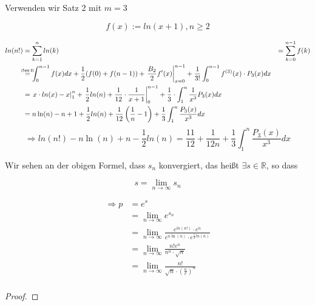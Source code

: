 \documentclass[12pt]{article}
\newcommand{\overtext}[2]{\mathrel{\overset{\makebox[0pt]{\mbox{\normalfont\tiny\sffamily #2}}}{#1}}}
\begin{document}
\begin{theorem}
Verwenden wir Satz 2 mit \(m = 3\)

\[f(x) := ln(x+1), n \geq 2\]

\begin{align*}
ln(n!) &= \sum_{k=1}^n ln(k) &= \sum_{k=0}^{n-1} f(k) \\
&\overtext{=}{(Satz 2)} \int_0^{n-1} f(x) dx + \frac{1}{2}(f(0)+f(n-1)) + \left. \frac{B_2}{2} f'(x) \right|_{x=0}^{n-1} + \frac{1}{3!} \int_0^{n-1} f^{(3)}(x) \cdot P_3(x) dx \\
&= \left. x \cdot ln(x) - x \right|_1^n + \left. \frac{1}{2}ln(n) + \frac{1}{12}\cdot\frac{1}{x+1} \right|_0^{n-1} + \frac{1}{3}\cdot\int_1^n \frac{1}{x^3} P_3(x) dx \\
&= n\ln(n) - n + 1 + \frac{1}{2} ln(n) + \frac{1}{12}\left(\frac{1}{n} - 1\right) + \frac{1}{3} \int_1^n \frac{P_3(x)}{x^3} dx \\
\end{align*}
\[\Longrightarrow ln(n!) - n\ln(n) + n - \frac{1}{2}ln(n) = \frac{11}{12} + \frac{1}{12n} + \frac{1}{3} \int_1^n \frac{P_3(x)}{x^3} dx\]

Wir sehen an der obigen Formel, dass \(s_n\) konvergiert, das heißt \(\exists s\in\mathbb{R}\), so dass

\[s = \lim_{n\to\infty} s_n\]

\begin{align*}
\Longrightarrow p &= e^s \\
&= \lim_{n\to\infty} e^{s_n} \\
&= \lim_{n\to\infty} \frac{e^{ln(n!)} \cdot e^n}{e^{n\ln(n)}\cdot e^{\frac{1}{2}ln(n)}} \\
&= \lim_{n\to\infty} \frac{n!e^n}{n^n\cdot\sqrt{n}} \\
&= \lim_{n\to\infty} \frac{n!}{\sqrt{n}\cdot\left(\frac{n}{e}\right)^n} \\
\end{align*}

\end{theorem}
\begin{proof}

\end{proof}
\end{document}
